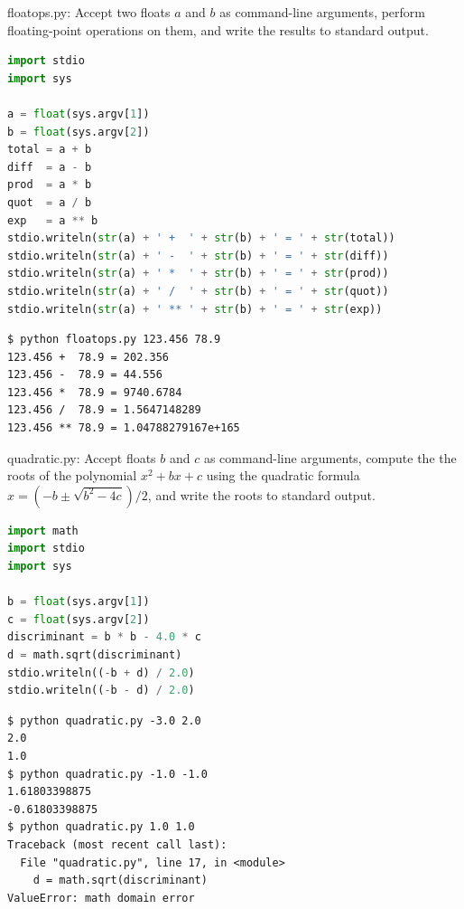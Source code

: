 \documentclass[8pt,a4paper,compress]{beamer}
\begin{document}
\begin{frame}[fragile]
\pause

\begin{framed}
\tiny floatops.py: Accept two floats $a$ and $b$ as command-line arguments, perform floating-point operations on them, and write the results to standard output.
\end{framed}

\begin{lstlisting}[language=Python]
import stdio
import sys

a = float(sys.argv[1])
b = float(sys.argv[2])
total = a + b
diff  = a - b
prod  = a * b
quot  = a / b
exp   = a ** b
stdio.writeln(str(a) + ' +  ' + str(b) + ' = ' + str(total))
stdio.writeln(str(a) + ' -  ' + str(b) + ' = ' + str(diff))
stdio.writeln(str(a) + ' *  ' + str(b) + ' = ' + str(prod))
stdio.writeln(str(a) + ' /  ' + str(b) + ' = ' + str(quot))
stdio.writeln(str(a) + ' ** ' + str(b) + ' = ' + str(exp))
\end{lstlisting}

\pause

\begin{lstlisting}[language={}]
$ python floatops.py 123.456 78.9
123.456 +  78.9 = 202.356
123.456 -  78.9 = 44.556
123.456 *  78.9 = 9740.6784
123.456 /  78.9 = 1.5647148289
123.456 ** 78.9 = 1.04788279167e+165
\end{lstlisting}
\end{frame}

\begin{frame}[fragile]
\pause

\begin{framed}
\tiny quadratic.py: Accept floats $b$ and $c$ as command-line arguments, compute the the roots of the polynomial $x^2 + bx + c$ using the quadratic formula $x=(-b\pm \sqrt{b^2-4c})/2$, and write the roots to standard output.
\end{framed}

\begin{lstlisting}[language=Python]
import math
import stdio
import sys

b = float(sys.argv[1])
c = float(sys.argv[2])
discriminant = b * b - 4.0 * c
d = math.sqrt(discriminant)
stdio.writeln((-b + d) / 2.0)
stdio.writeln((-b - d) / 2.0)
\end{lstlisting}

\pause

\begin{lstlisting}[language={}]
$ python quadratic.py -3.0 2.0
2.0
1.0
$ python quadratic.py -1.0 -1.0
1.61803398875
-0.61803398875
$ python quadratic.py 1.0 1.0
Traceback (most recent call last):
  File "quadratic.py", line 17, in <module>
    d = math.sqrt(discriminant)
ValueError: math domain error
\end{lstlisting}
\end{frame}
\end{document}
